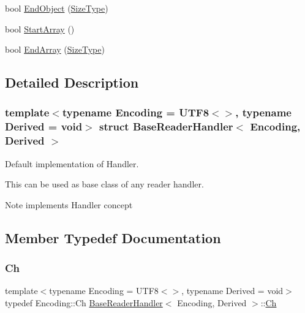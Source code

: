 \begin{DoxyCompactItemize}
\item 
bool \hyperlink{structBaseReaderHandler_a0406cee0af26bc3a0b7fb2414537b0ab}{End\+Object} (\hyperlink{rapidjson_8h_a5ed6e6e67250fadbd041127e6386dcb5}{Size\+Type})
\item 
bool \hyperlink{structBaseReaderHandler_a9dbb1143a250a904bb18a174553a3a00}{Start\+Array} ()
\item 
bool \hyperlink{structBaseReaderHandler_ae9d60a8779b6a77a7f283d64961879fb}{End\+Array} (\hyperlink{rapidjson_8h_a5ed6e6e67250fadbd041127e6386dcb5}{Size\+Type})
\end{DoxyCompactItemize}


\subsection{Detailed Description}
\subsubsection*{template$<$typename Encoding = U\+T\+F8$<$$>$, typename Derived = void$>$\newline
struct Base\+Reader\+Handler$<$ Encoding, Derived $>$}

Default implementation of Handler. 

This can be used as base class of any reader handler. \begin{DoxyNote}{Note}
implements Handler concept 
\end{DoxyNote}


\subsection{Member Typedef Documentation}
\mbox{\label{structBaseReaderHandler_a8302c755dd3560c8c5bac99162c28214}} 
\subsubsection{\texorpdfstring{Ch}{Ch}}
{\footnotesize\ttfamily template$<$typename Encoding = U\+T\+F8$<$$>$, typename Derived = void$>$ \\
typedef Encoding\+::\+Ch \hyperlink{structBaseReaderHandler}{Base\+Reader\+Handler}$<$ Encoding, Derived $>$\+::\hyperlink{structBaseReaderHandler_a8302c755dd3560c8c5bac99162c28214}{Ch}}

